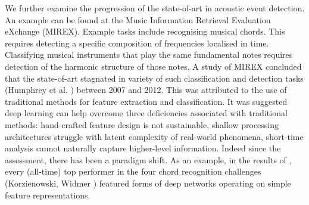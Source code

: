 \documentclass[12pt]{llncs}
\begin{document}
We further examine the progression of the state-of-art in acoustic event detection. An example can be found at the Music Information Retrieval Evaluation eXchange (MIREX). Example tasks include recognising musical chords. This requires detecting a specific composition of frequencies localised in time. Classifying musical instruments that play the same fundamental notes requires detection of the harmonic structure of those notes. 
A study of MIREX concluded that the state-of-art stagnated in variety of such classification and detection tasks (Humphrey et al. \cite{humphrey2013feature}) between 2007 and 2012. 
This was attributed to the use of traditional methods for feature extraction and classification. It was suggested deep learning can help overcome three deficiencies associated with traditional methods: hand-crafted feature design is not sustainable, shallow processing architectures struggle with latent complexity of real-world phenomena, short-time analysis cannot naturally capture higher-level information.
Indeed since the assessment, there has been a paradigm shift. As an example, in the results of \cite{mirex2016}, every (all-time) top performer in the four chord recognition challenges (Korzienowski, Widmer \cite{mirex2016chord}) featured forms of deep networks operating on simple feature representations. 
\end{document}
